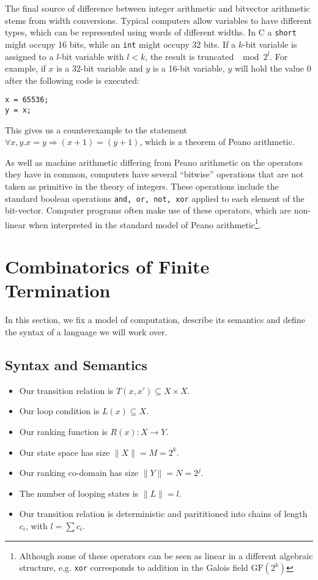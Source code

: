 \documentclass[preprint]{sigplanconf}
\theoremstyle{definition}
\begin{document}
The final source of difference between integer arithmetic and bitvector
arithmetic stems from width conversions.  Typical computers allow variables
to have different types, which can be represented using words of different
widths.  In C a \texttt{short} might occupy 16 bits, while an \texttt{int}
might occupy 32 bits.  If a $k$-bit variable is assigned to a $l$-bit
variable with $l < k$, the result is truncated $\mod 2^l$.  For example, if
$x$ is a 32-bit variable and $y$ is a 16-bit variable, $y$ will hold the
value $0$ after the following code is executed:

\begin{lstlisting}
x = 65536;
y = x;
\end{lstlisting}

This gives us a counterexample to the statement $\forall x, y . x = y \Rightarrow (x + 1) = (y + 1)$,
which is a theorem of Peano arithmetic.

As well as machine arithmetic differing from Peano arithmetic on the
operators they have in common, computers have several ``bitwise'' operations
that are not taken as primitive in the theory of integers.  These operations
include the standard boolean operations \texttt{and, or, not, xor} applied
to each element of the bit-vector.  Computer programs often make use of
these operators, which are non-linear when interpreted in the standard model
of Peano arithmetic\footnote{ Although some of these operators can be seen
as linear in a different algebraic structure, e.g.  \texttt{xor} corresponds
to addition in the Galois field $\mathrm{GF}(2^k)$}.

\iffalse
\section{Combinatorics of Finite Termination}
In this section, we fix a model of computation, describe its semantics and
define the syntax of a language we will work over.

\subsection{Syntax and Semantics}

\begin{itemize}
 \item Our transition relation is $T(x, x') \subseteq X \times X$.
 \item Our loop condition is $L(x) \subseteq X$.
 \item Our ranking function is $R(x) : X \to Y$.
 \item Our state space has size $\| X \| = M = 2^k$.
 \item Our ranking co-domain has size $\| Y \| = N = 2^j$.
 \item The number of looping states is $\| L \| = l$.
 \item Our transition relation is deterministic and parititioned into chains of length $c_i$, with $l = \sum c_i$.
\end{itemize}
\end{document}
